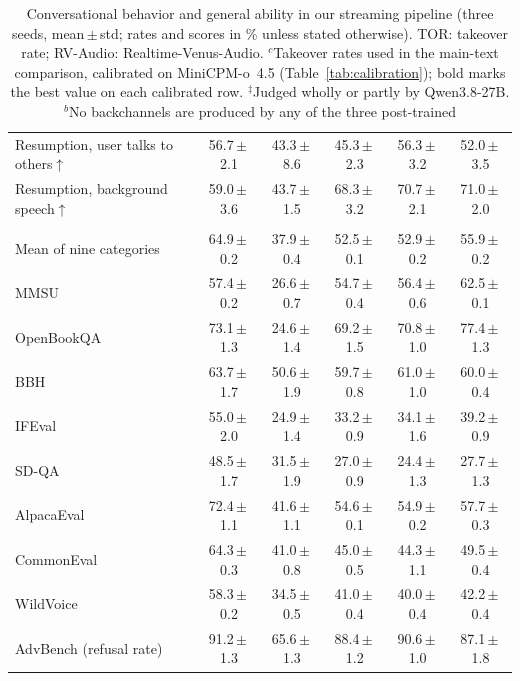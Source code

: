 \begin{table}[tp]
\begin{tabular}{@{}lcccc>{\columncolor{oursfill}}c@{}}
Resumption, user talks to others$\uparrow$ & 56.7\,$\pm$\,2.1 & 43.3\,$\pm$\,8.6 & 45.3\,$\pm$\,2.3 & 56.3\,$\pm$\,3.2 & 52.0\,$\pm$\,3.5\\
Resumption, background speech$\uparrow$    & 59.0\,$\pm$\,3.6 & 43.7\,$\pm$\,1.5 & 68.3\,$\pm$\,3.2 & 70.7\,$\pm$\,2.1 & 71.0\,$\pm$\,2.0\\
\midrule
\rowcolor{tablealt}\multicolumn{6}{@{}l}{\textit{(c) VoiceBench$^{\ddagger}$ (all $\uparrow$)}}\\
Mean of nine categories                    & 64.9\,$\pm$\,0.2 & 37.9\,$\pm$\,0.4 & 52.5\,$\pm$\,0.1 & 52.9\,$\pm$\,0.2 & 55.9\,$\pm$\,0.2\\
MMSU                                       & 57.4\,$\pm$\,0.2 & 26.6\,$\pm$\,0.7 & 54.7\,$\pm$\,0.4 & 56.4\,$\pm$\,0.6 & 62.5\,$\pm$\,0.1\\
OpenBookQA                                 & 73.1\,$\pm$\,1.3 & 24.6\,$\pm$\,1.4 & 69.2\,$\pm$\,1.5 & 70.8\,$\pm$\,1.0 & 77.4\,$\pm$\,1.3\\
BBH                                        & 63.7\,$\pm$\,1.7 & 50.6\,$\pm$\,1.9 & 59.7\,$\pm$\,0.8 & 61.0\,$\pm$\,1.0 & 60.0\,$\pm$\,0.4\\
IFEval                                     & 55.0\,$\pm$\,2.0 & 24.9\,$\pm$\,1.4 & 33.2\,$\pm$\,0.9 & 34.1\,$\pm$\,1.6 & 39.2\,$\pm$\,0.9\\
SD-QA                                      & 48.5\,$\pm$\,1.7 & 31.5\,$\pm$\,1.9 & 27.0\,$\pm$\,0.9 & 24.4\,$\pm$\,1.3 & 27.7\,$\pm$\,1.3\\
AlpacaEval                                 & 72.4\,$\pm$\,1.1 & 41.6\,$\pm$\,1.1 & 54.6\,$\pm$\,0.1 & 54.9\,$\pm$\,0.2 & 57.7\,$\pm$\,0.3\\
CommonEval                                 & 64.3\,$\pm$\,0.3 & 41.0\,$\pm$\,0.8 & 45.0\,$\pm$\,0.5 & 44.3\,$\pm$\,1.1 & 49.5\,$\pm$\,0.4\\
WildVoice                                  & 58.3\,$\pm$\,0.2 & 34.5\,$\pm$\,0.5 & 41.0\,$\pm$\,0.4 & 40.0\,$\pm$\,0.4 & 42.2\,$\pm$\,0.4\\
AdvBench (refusal rate)                    & 91.2\,$\pm$\,1.3 & 65.6\,$\pm$\,1.3 & 88.4\,$\pm$\,1.2 & 90.6\,$\pm$\,1.0 & 87.1\,$\pm$\,1.8\\
\bottomrule
\end{tabular}
\caption{Conversational behavior and general ability in our streaming pipeline (three seeds, mean\,$\pm$\,std; rates and scores in \% unless stated otherwise). TOR: takeover rate; RV-Audio: Realtime-Venus-Audio. $^{c}$Takeover rates used in the main-text comparison, calibrated on MiniCPM-o~4.5 (Table~\ref{tab:calibration}); bold marks the best value on each calibrated row. $^{\ddagger}$Judged wholly or partly by Qwen3.8-27B. $^{b}$No backchannels are produced by any of the three post-trained
}
\end{table}
